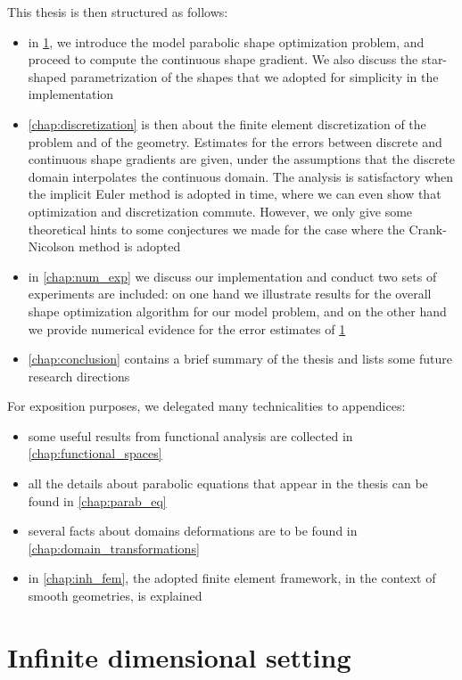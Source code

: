 \documentclass[english,a4paper,9pt,oneside]{scrbook}	%
\theoremstyle{break}
\theoremstyle{remark}
\begin{document}
This thesis is then structured as follows:

\begin{itemize}
	\item in \cref{chap:cts_shape_opt}, we introduce the model parabolic shape optimization problem, and proceed to compute the continuous shape gradient. We also discuss the star-shaped parametrization of the shapes that we adopted for simplicity in the implementation
	\item \cref{chap:discretization} is then about the finite element discretization of the problem and of the geometry. Estimates for the errors between discrete and continuous shape gradients are given, under the assumptions that the discrete domain interpolates the continuous domain. The analysis is satisfactory when the implicit Euler method is adopted in time, where we can even show that optimization and discretization commute. However, we only give some theoretical hints to some conjectures we made for the case where the Crank-Nicolson method is adopted
	\item in \cref{chap:num_exp} we discuss our implementation and conduct two sets of experiments are included: on one hand we illustrate results for the overall shape optimization algorithm for our model problem, and on the other hand we provide numerical evidence for the error estimates of \cref{chap:cts_shape_opt}
	\item \cref{chap:conclusion} contains a brief summary of the thesis and lists some future research directions
\end{itemize}

For exposition purposes, we delegated many technicalities to appendices:

\begin{itemize}
	\item some useful results from functional analysis are collected in \cref{chap:functional_spaces}
	\item all the details about parabolic equations that appear in the thesis can be found in \cref{chap:parab_eq}
	\item several facts about domains deformations are to be found in \cref{chap:domain_transformations}
	\item in \cref{chap:inh_fem}, the adopted finite element framework, in the context of smooth geometries, is explained
\end{itemize}

\chapter{Infinite dimensional setting}
\label{chap:cts_shape_opt}
\end{document}
